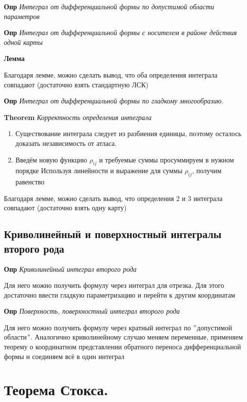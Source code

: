 \documentclass[a4paper, 14pt]{article}
\begin{document}
    \textbf{Опр} \textit{Интеграл от дифференциальной формы по допустимой области параметров}
    
    \textbf{Опр} \textit{Интеграл от дифференциальной формы с носителем в районе действия одной карты}
    
    \textbf{Лемма}
    
    Благодаря лемме, можно сделать вывод, что оба определения интеграла совпадают (достаточно взять стандартную ЛСК)
    
    \textbf{Опр} \textit{Интеграл от дифференциальной формы по гладкому многообразию.}
    
    \textbf{Theorem} \textit{Корректность определения интеграла}
    
    \begin{enumerate}
        \item Существование интеграла следует из разбиения единицы, поэтому осталось доказать независимость от атласа.
        \item Введём новую функцию $\rho_{ij}$ и требуемые суммы просуммируем в нужном порядке
        Используя линейности и выражение для суммы $\rho_{ij}$, получим равенство
    \end{enumerate}
    
    Благодаря лемме, можно сделать вывод, что определения 2 и 3 интеграла совпадают (достаточно взять одну карту)
    
    \subsection{Криволинейный и поверхностный интегралы второго рода}
    
    \textbf{Опр} \textit{Криволинейный интеграл второго рода}
    
    Для него можно получить формулу через интеграл для отрезка.
    Для этого достаточно ввести гладкую параметризацию и перейти к другим координатам
    
    \textbf{Опр} \textit{Поверхность, поверхностный интеграл второго рода}
    
    Для него можно получить формулу через кратный интеграл по \("\)допустимой области\("\).
    Аналогично криволинейному случаю меняем переменные, применяем теорему о координатном представлении обратного
    переноса дифференциальной формы и соединяем всё в один интеграл
    
    \section{Теорема Стокса.}
    
\end{document}
